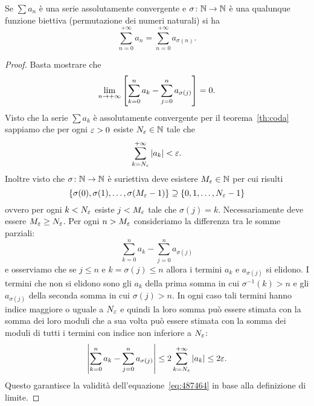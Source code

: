 \begin{theorem}%
\label{th:convergenza_incondizionata}%
\mymark{*}%
%
Se $\sum a_n$ è una serie assolutamente convergente e $\sigma\colon {\mathbb N} \to {\mathbb N}$
è una qualunque funzione biettiva (permutazione dei numeri naturali)
si ha
\[
  \sum_{n=0}^{+\infty} a_n = \sum_{n=0}^{+\infty} a_{\sigma(n)}.
\]
\end{theorem}
%
\begin{proof}
Basta mostrare che
\begin{equation}
\label{eq:487464}
\lim_{n\to +\infty} {\left[ \sum_{k=0}^n a_k
 - \sum_{j=0}^n a_{\sigma(j)} \right]} = 0.
\end{equation}
Visto che la serie $\sum a_k$ è assolutamente convergente
per il teorema~\ref{th:coda} sappiamo
che per ogni $\varepsilon>0$ esiste $N_\varepsilon\in {\mathbb N}$ tale che
\[
  \sum_{k=N_\varepsilon}^{+\infty} {\left|a_k\right|} < \varepsilon.
\]
Inoltre visto che $\sigma\colon {\mathbb N} \to {\mathbb N}$ è suriettiva
deve esistere $M_\varepsilon \in {\mathbb N}$ per cui risulti
\[
 {\left\{ \sigma(0), \sigma(1), \dots, \sigma(M_\varepsilon-1) \right\}}
 \supseteq {\left\{ 0,1,\dots, N_\varepsilon- 1 \right\}}
\]
ovvero per ogni $k<N_\varepsilon$ esiste $j<M_\varepsilon$ tale
che $\sigma(j)=k$.
Necessariamente deve essere $M_\varepsilon\ge N_\varepsilon$.
Per ogni $n>M_\varepsilon$ consideriamo
la differenza tra le somme parziali:
\[
\sum_{k=0}^n a_k - \sum_{j=0}^n a_{\sigma(j)}
\]
e osserviamo che se $j\le n$ e $k=\sigma(j)\le n$ allora
i termini $a_k$ e $a_{\sigma(j)}$ si elidono.
I termini che non si elidono sono gli $a_k$ della prima somma
in cui $\sigma^{-1}(k)>n$ e gli $a_{\sigma(j)}$
della seconda somma in cui $\sigma(j)>n$.
In ogni caso tali termini hanno indice maggiore
o uguale a $N_\varepsilon$ e quindi la loro somma
può essere stimata con la somma dei loro moduli
che a sua volta può essere stimata con la somma
dei moduli di tutti i termini con indice
non inferiore a $N_\varepsilon$:
\begin{align*}
  {\left|\sum_{k=0}^n a_k - \sum_{j=0}^n a_{\sigma(j)}\right|}
  \le 2 \sum_{k=N_\varepsilon}^{+\infty} {\left|a_k\right|} \le 2\varepsilon.
\end{align*}
Questo garantisce la validità dell'equazione~\eqref{eq:487464} in base
alla definizione di limite.
\end{proof}

